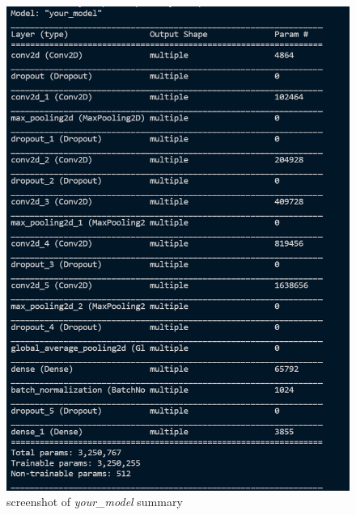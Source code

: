 \begin{figure}[htbp]
    \centering
    \includegraphics[scale=0.6]{your_model_summary.png}
    \caption{screenshot of \emph{your\_model} summary}
    \label{fig:your_model_summary}
\end{figure}

